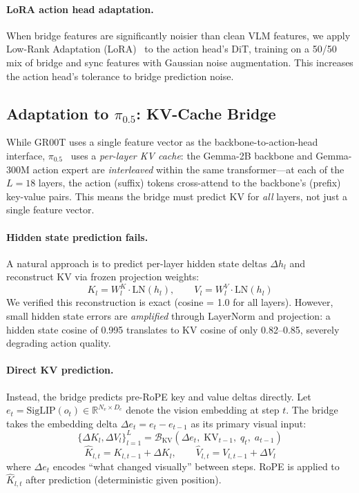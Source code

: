 \documentclass{article}
\begin{document}
\paragraph{LoRA action head adaptation.}
When bridge features are significantly noisier than clean VLM features, we apply Low-Rank Adaptation (LoRA)~\cite{hu2022lora} to the action head's DiT, training on a 50/50 mix of bridge and sync features with Gaussian noise augmentation.
This increases the action head's tolerance to bridge prediction noise.

\subsection{Adaptation to $\pi_{0.5}$: KV-Cache Bridge}

While GR00T uses a single feature vector as the backbone-to-action-head interface, $\pi_{0.5}$~\cite{black2024pi0} uses a \emph{per-layer KV cache}: the Gemma-2B backbone and Gemma-300M action expert are \emph{interleaved} within the same transformer---at each of the $L{=}18$ layers, the action (suffix) tokens cross-attend to the backbone's (prefix) key-value pairs.
This means the bridge must predict KV for \emph{all} layers, not just a single feature vector.

\paragraph{Hidden state prediction fails.}
A natural approach is to predict per-layer hidden state deltas $\Delta h_l$ and reconstruct KV via frozen projection weights:
\begin{equation}
    K_l = W^K_l \cdot \text{LN}(h_l), \qquad V_l = W^V_l \cdot \text{LN}(h_l)
    \label{eq:kv_recon}
\end{equation}
We verified this reconstruction is exact (cosine = 1.0 for all layers).
However, small hidden state errors are \emph{amplified} through LayerNorm and projection: a hidden state cosine of 0.995 translates to KV cosine of only 0.82--0.85, severely degrading action quality.

\paragraph{Direct KV prediction.}
Instead, the bridge predicts pre-RoPE key and value deltas directly.
Let $e_t = \text{SigLIP}(o_t) \in \mathbb{R}^{N_v \times D_e}$ denote the vision embedding at step $t$.
The bridge takes the embedding delta $\Delta e_t = e_t - e_{t-1}$ as its primary visual input:
\begin{equation}
    \{\Delta K_l, \Delta V_l\}_{l=1}^{L} = \mathcal{B}_\text{KV}(\Delta e_t,\; \text{KV}_{t-1},\; q_t,\; a_{t-1})
    \label{eq:kv_bridge}
\end{equation}
\begin{equation}
    \hat{K}_{l,t} = K_{l,t-1} + \Delta K_l, \qquad \hat{V}_{l,t} = V_{l,t-1} + \Delta V_l
\end{equation}
where $\Delta e_t$ encodes ``what changed visually'' between steps.
RoPE is applied to $\hat{K}_{l,t}$ after prediction (deterministic given position).
\end{document}
